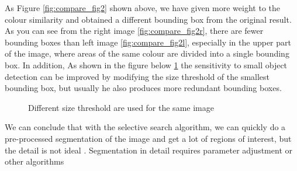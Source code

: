 As Figure \ref{fig:compare_fig2} shown above, we have given more weight to the colour similarity and obtained a different bounding box from the original result. As you can see from the right image  \ref{fig:compare_fig2r}, there are fewer bounding boxes than left image \ref{fig:compare_fig2l}, especially in the upper part of the image, where areas of the same colour are divided into a single bounding box. In addition, As shown in the figure below \ref{fig:compare_fig3} the sensitivity to small object detection can be improved by modifying the size threshold of the smallest bounding box, but usually he also produces more redundant bounding boxes.
\begin{figure}[htbp]
	\centering
	
	\centering
	\caption{Different size threshold are used for the same image}
	\vspace{-0.2cm}
	\label{fig:compare_fig3}
\end{figure}

We can conclude that with the selective search algorithm, we can quickly do a pre-processed segmentation of the image and get a lot of regions of interest, but the detail is not ideal . Segmentation in detail requires parameter adjustment or other algorithms






